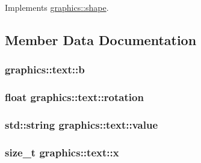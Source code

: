 Implements \hyperlink{classgraphics_1_1shape_a948bd22d258ce2122b81c7385a315596}{graphics\+::shape}.



\subsection{Member Data Documentation}
\subsubsection[{\texorpdfstring{b}{b}}]{ graphics\+::text\+::b\hspace{0.3cm}{\ttfamily [private]}}\hypertarget{classgraphics_1_1text_a79220736a8af6f8656434126da59de9f}{}\label{classgraphics_1_1text_a79220736a8af6f8656434126da59de9f}
\subsubsection[{\texorpdfstring{rotation}{rotation}}]{\setlength{\rightskip}{0pt plus 5cm}float graphics\+::text\+::rotation\hspace{0.3cm}{\ttfamily [private]}}\hypertarget{classgraphics_1_1text_abee4722ae48b37b004069b10c0c99bea}{}\label{classgraphics_1_1text_abee4722ae48b37b004069b10c0c99bea}
\subsubsection[{\texorpdfstring{value}{value}}]{\setlength{\rightskip}{0pt plus 5cm}std\+::string graphics\+::text\+::value\hspace{0.3cm}{\ttfamily [private]}}\hypertarget{classgraphics_1_1text_a1dd8d9d9060ca92122c0ff18ccb00031}{}\label{classgraphics_1_1text_a1dd8d9d9060ca92122c0ff18ccb00031}
\subsubsection[{\texorpdfstring{x}{x}}]{\setlength{\rightskip}{0pt plus 5cm}size\+\_\+t graphics\+::text\+::x\hspace{0.3cm}{\ttfamily [private]}}\hypertarget{classgraphics_1_1text_a5bd7f99e13dfc031dbf02f3a2a1cca75}{}\label{classgraphics_1_1text_a5bd7f99e13dfc031dbf02f3a2a1cca75}

